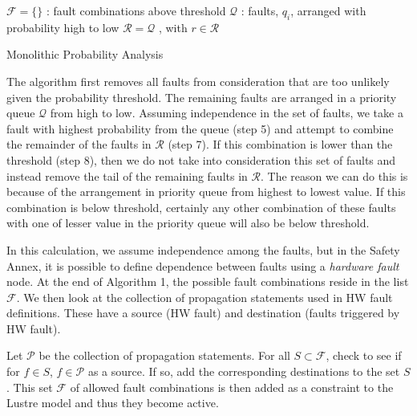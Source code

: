 \begin{algorithm}[H]
 $\mathcal{F} = \{\}$ : fault combinations above threshold \;
 $\mathcal{Q}$ : faults, $q_i$, arranged with probability high to low \;
 $\mathcal{R} = \mathcal{Q}$ , with $r \in \mathcal{R}$\;
 \caption{Monolithic Probability Analysis}
\end{algorithm}

The algorithm first removes all faults from consideration that are too unlikely given the probability threshold. The remaining faults are arranged in a priority queue $\mathcal{Q}$ from high to low. Assuming independence in the set of faults, we take a fault with highest probability from the queue (step 5) and attempt to combine the remainder of the faults in $\mathcal{R}$ (step 7). If this combination is lower than the threshold (step 8), then we do not take into consideration this set of faults and instead remove the tail of the remaining faults in $\mathcal{R}$. The reason we can do this is because of the arrangement in priority queue from highest to lowest value. If this combination is below threshold, certainly any other combination of these faults with one of lesser value in the priority queue will also be below threshold. 
 
In this calculation, we assume independence among the faults, but in the Safety Annex, it is possible to define dependence between faults using a \textit{hardware fault} node. At the end of Algorithm 1, the possible fault combinations reside in the list $\mathcal{F}$. We then look at the collection of propagation statements used in HW fault definitions. These have a source (HW fault) and destination (faults triggered by HW fault). 

Let $\mathcal{P}$ be the collection of propagation statements. For all $S \subset \mathcal{F}$, check to see if for $f \in S$, $f \in \mathcal{P}$ as a source. If so, add the corresponding destinations to the set $S$. This set $\mathcal{F}$ of allowed fault combinations is then added as a constraint to the Lustre model and thus they become active. 

